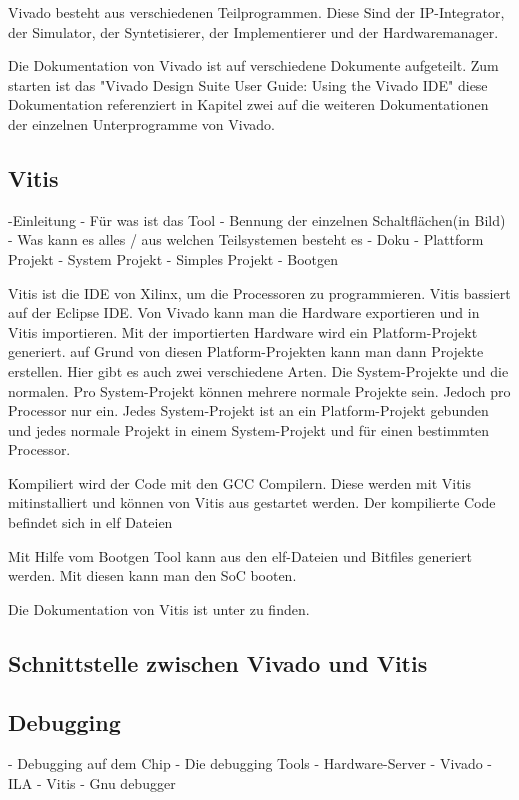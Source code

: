 \documentclass{article}
\begin{document}
Vivado besteht aus verschiedenen Teilprogrammen. Diese Sind der IP-Integrator, der Simulator, der Syntetisierer, der Implementierer und der Hardwaremanager.

Die Dokumentation von Vivado ist auf verschiedene Dokumente aufgeteilt. Zum starten ist das "Vivado Design Suite User Guide: Using the Vivado IDE" diese Dokumentation referenziert in Kapitel zwei auf die weiteren Dokumentationen der einzelnen Unterprogramme von Vivado.


\subsection{Vitis}
-Einleitung
    - Für was ist das Tool
    - Bennung der einzelnen Schaltflächen(in Bild)
    - Was kann es alles / aus welchen Teilsystemen besteht es
    - Doku
- Plattform Projekt
- System Projekt
- Simples Projekt
- Bootgen

Vitis ist die IDE von Xilinx, um die Processoren zu programmieren. Vitis bassiert auf der Eclipse IDE. 
Von Vivado kann man die Hardware exportieren und in Vitis importieren. Mit der importierten Hardware wird ein Platform-Projekt generiert. auf Grund von diesen Platform-Projekten kann man dann Projekte erstellen. Hier gibt es auch zwei verschiedene Arten. Die System-Projekte und die normalen. Pro System-Projekt können mehrere normale Projekte sein. Jedoch pro Processor nur ein. Jedes System-Projekt ist an ein Platform-Projekt gebunden und jedes normale Projekt in einem System-Projekt und für einen bestimmten Processor.

Kompiliert wird der Code mit den GCC Compilern. Diese werden mit Vitis mitinstalliert und können von Vitis aus gestartet werden. Der kompilierte Code befindet sich in elf Dateien

Mit Hilfe vom Bootgen Tool kann aus den elf-Dateien und Bitfiles generiert werden. Mit diesen kann man den SoC booten.

Die Dokumentation von Vitis ist unter  zu finden.

\subsection{Schnittstelle zwischen Vivado und Vitis}



\subsection{Debugging}
- Debugging auf dem Chip
- Die debugging Tools
    - Hardware-Server
    - Vivado
        - ILA
    - Vitis
        - Gnu debugger
\end{document}
